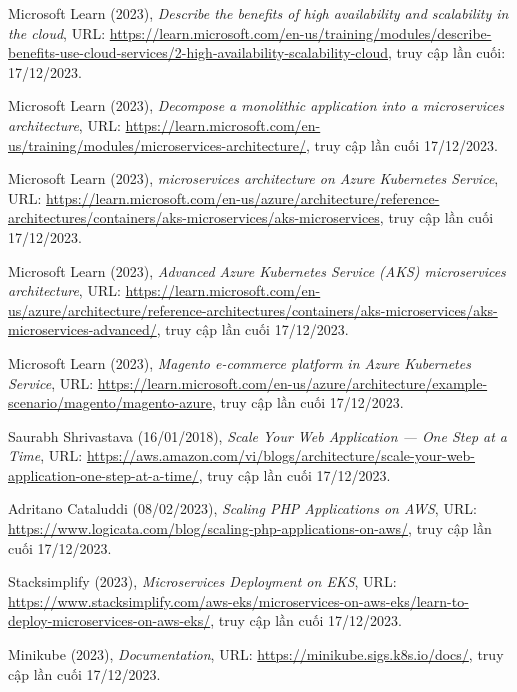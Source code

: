 \begin{thebibliography}{1}
Microsoft Learn (2023), \emph{Describe the benefits of high availability and scalability in the cloud}, URL: \url{https://learn.microsoft.com/en-us/training/modules/describe-benefits-use-cloud-services/2-high-availability-scalability-cloud}, truy cập lần cuối: 17/12/2023.

Microsoft Learn (2023), \emph{Decompose a monolithic application into a microservices architecture}, URL: \url{https://learn.microsoft.com/en-us/training/modules/microservices-architecture/}, truy cập lần cuối 17/12/2023.

Microsoft Learn (2023), \emph{microservices architecture on Azure Kubernetes Service}, URL: \url{https://learn.microsoft.com/en-us/azure/architecture/reference-architectures/containers/aks-microservices/aks-microservices}, truy cập lần cuối 17/12/2023.

Microsoft Learn (2023), \emph{Advanced Azure Kubernetes Service (AKS) microservices architecture}, URL: \url{https://learn.microsoft.com/en-us/azure/architecture/reference-architectures/containers/aks-microservices/aks-microservices-advanced/}, truy cập lần cuối 17/12/2023.

Microsoft Learn (2023), \emph{Magento e-commerce platform in Azure Kubernetes Service}, URL: \url{https://learn.microsoft.com/en-us/azure/architecture/example-scenario/magento/magento-azure}, truy cập lần cuối 17/12/2023.

Saurabh Shrivastava (16/01/2018), \emph{Scale Your Web Application — One Step at a Time}, URL: \url{https://aws.amazon.com/vi/blogs/architecture/scale-your-web-application-one-step-at-a-time/}, truy cập lần cuối 17/12/2023.

Adritano Cataluddi (08/02/2023), \emph{Scaling PHP Applications on AWS}, URL: \url{https://www.logicata.com/blog/scaling-php-applications-on-aws/}, truy cập lần cuối 17/12/2023.

Stacksimplify (2023), \emph{Microservices Deployment on EKS}, URL: \url{https://www.stacksimplify.com/aws-eks/microservices-on-aws-eks/learn-to-deploy-microservices-on-aws-eks/}, truy cập lần cuối 17/12/2023.

Minikube (2023), \emph{Documentation}, URL: \url{https://minikube.sigs.k8s.io/docs/}, truy cập lần cuối 17/12/2023.


\end{thebibliography}
